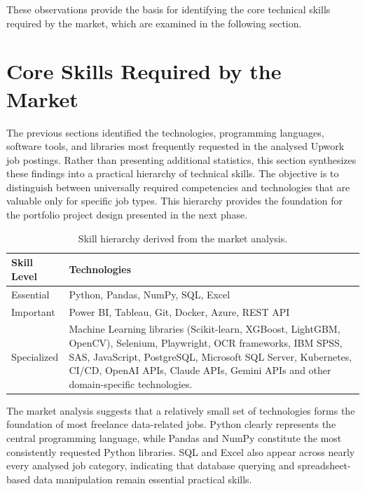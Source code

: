 These observations provide the basis for identifying the core technical skills required by the market, which are examined in the following section.

\section{Core Skills Required by the Market} 

The previous sections identified the technologies, programming languages, software tools, and libraries most frequently requested in the analysed
Upwork job postings. Rather than presenting additional statistics, this section synthesizes these findings into a practical hierarchy of technical skills.
The objective is to distinguish between universally required competencies and technologies that are valuable only for specific job types.
This hierarchy provides the foundation for the portfolio project design presented in the next phase.

\begin{table}[H]
\centering
\small
\caption{Skill hierarchy derived from the market analysis.}
\label{tab:skill_hierarchy}

\begin{tabularx}{\textwidth}{l X}
\toprule
\textbf{Skill Level} & \textbf{Technologies} \\
\midrule

Essential &
Python, Pandas, NumPy, SQL, Excel \\

Important &
Power BI, Tableau, Git, Docker, Azure, REST API \\

Specialized &
Machine Learning libraries (Scikit-learn, XGBoost, LightGBM, OpenCV), Selenium, Playwright, OCR frameworks, IBM SPSS, SAS, JavaScript, PostgreSQL,
Microsoft SQL Server, Kubernetes, CI/CD, OpenAI APIs, Claude APIs, Gemini APIs and other domain-specific technologies. \\

\bottomrule
\end{tabularx}
\end{table} 

The market analysis suggests that a relatively small set of technologies forms the foundation of most freelance data-related jobs. Python clearly represents
the central programming language, while Pandas and NumPy constitute the most consistently requested Python libraries. SQL and Excel also appear across
nearly every analysed job category, indicating that database querying and spreadsheet-based data manipulation remain essential practical skills.

